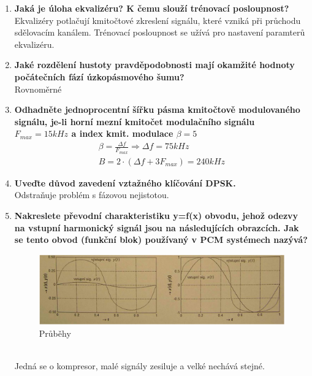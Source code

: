 \begin{enumerate}
    \item \textbf{Jaká je úloha ekvalizéru? K čemu slouží trénovací posloupnost?}\\
    Ekvalizéry potlačují kmitočtové zkreslení signálu, které vzniká při průchodu sdělovacím kanálem. Trénovací posloupnost se užívá pro nastavení paramterů ekvalizéru.
    \item \textbf{Jaké rozdělení hustoty pravděpodobnosti mají okamžité hodnoty počátečních fází úzkopásmového šumu?}\\
    Rovnoměrné
    \item \textbf{Odhadněte jednoprocentní šířku pásma kmitočtově modulovaného signálu, je-li horní mezní
    kmitočet modulačního signálu \(F_{max} =15 kHz\) a index kmit. modulace \(\beta=5\)}
    \begin{gather*}
        \beta = \frac{\Delta f}{F_{max}} \Rightarrow \Delta f = 75kHz\\
        B = 2\cdot (\Delta f + 3 F_{max}) = 240kHz
    \end{gather*}
    \item \textbf{Uveďte důvod zavedení vztažného klíčování DPSK.}\\
    Odstraňuje problém s fázovou nejistotou.
    \item \textbf{Nakreslete převodní charakteristiku y=f(x) obvodu, jehož odezvy na vstupní harmonický
    signál jsou na následujících obrazcích. Jak se tento obvod (funkční blok) používaný v PCM
    systémech nazývá?}\\
    \begin{figure}[h]
        \centering
        \includegraphics[scale = 0.3]{images/4.10.png}
        \caption{Průběhy}
    \end{figure}\\
    Jedná se o kompresor, malé signály zesiluje a velké nechává stejné.\\
\end{enumerate}


